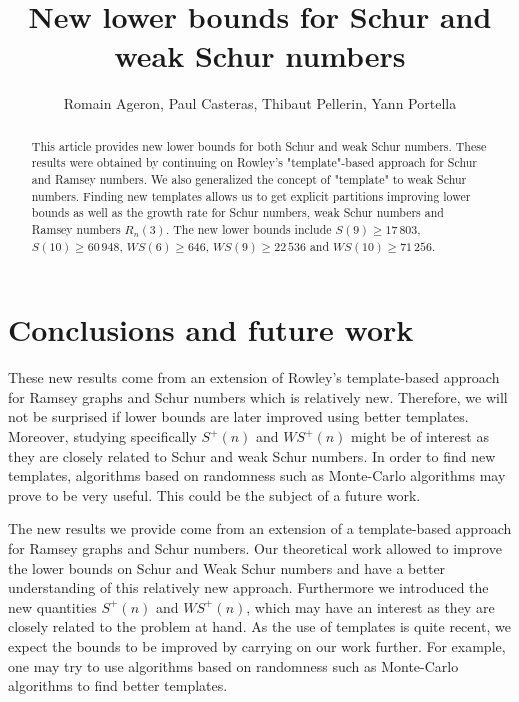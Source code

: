 \documentclass[3p]{elsarticle}
\title{New lower bounds for Schur and weak Schur numbers}
\author{Romain Ageron, Paul Casteras, Thibaut Pellerin, Yann Portella}
\newtheorem{computational theorem}[definition]{Computational Theorem}
\newcommand{\WS}{\mathit{WS}}
\begin{document}
\begin{abstract}

This article provides new lower bounds for both Schur and weak Schur numbers. These results were obtained by 
continuing on Rowley's "template"-based approach for Schur and Ramsey numbers. We also generalized the concept 
of "template" to weak Schur numbers. Finding new templates allows us to get explicit partitions improving lower bounds 
as well as the growth rate for Schur numbers, weak Schur numbers and Ramsey numbers \(R_n(3)\). The new lower 
bounds include \(S(9) \geqslant 17\,803\), \(S(10) \geqslant 60\,948\), \(\WS(6) \geqslant 646\), \(\WS (9) \geqslant 22\,536\) and 
\(\WS (10) \geqslant 71\,256 \).

\end{abstract}

\maketitle







\section{Conclusions and future work}

 These new results come from an extension of Rowley's template-based approach for Ramsey graphs and 
Schur numbers which is relatively new. Therefore, we will not be surprised if lower bounds are later improved 
using better templates. Moreover, studying specifically \(S^+(n)\) and \(\WS^+(n)\) might be of interest as they
 are closely related to Schur and weak Schur numbers. In order to find new templates, algorithms based on 
randomness such as Monte-Carlo algorithms may prove to be very useful. This could be the subject of a future work.

 The new results we provide come from an extension of a template-based approach for Ramsey graphs
and Schur numbers. Our theoretical work allowed to improve the lower bounds on Schur and Weak Schur numbers and have
a better understanding of this relatively new approach. Furthermore we introduced the new quantities \(S^+(n)\) and
\(\WS^+(n)\), which may have an interest as they are closely related to the problem at hand. As the use of templates
is quite recent, we expect the bounds to be improved by carrying on our work further. For example, one may try to use
algorithms based on randomness such as Monte-Carlo algorithms to find better templates.
\end{document}
